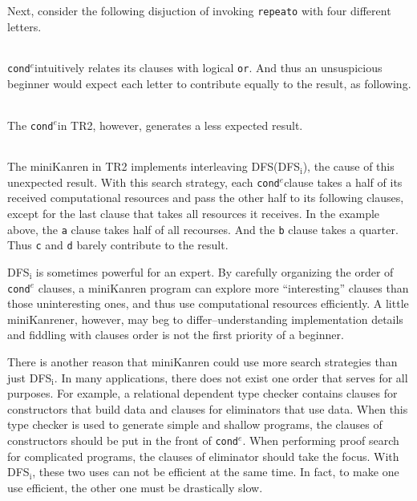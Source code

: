 \documentclass[format=acmlarge, review=true, authordraft=true]{acmart}
\newcommand{\conde}{\texttt{cond$^e$}}
\newcommand{\clisting}[1]{
\begin{center}
  \begin{tabular}{c}
	
    \end{tabular}
\end{center}
}
\newcommand{\DFSi}[0]{DFS$_\textrm{i}$}
\begin{document}
\clisting{Figures/repeato.rkt}

Next, consider the following disjuction of invoking \texttt{repeato} with four 
different letters.

\clisting{Figures/example.rkt}

\conde intuitively relates its clauses with logical \texttt{or}. And thus an 
unsuspicious beginner would expect each letter to contribute equally to the 
result, as following.

\clisting{Figures/run-repeato-fair.rkt}

The \conde in TR2, however, generates a less expected result.

\clisting{Figures/run-repeato-idfs.rkt}

The miniKanren in TR2 implements interleaving DFS(\DFSi), the cause of this 
unexpected result. With this search strategy, each \conde clause takes a half 
of its received computational resources and pass the other half to its 
following clauses, except for the last clause that takes all resources it 
receives. In the example above, the \texttt{a} clause takes half of all 
recourses. And the \texttt{b} clause takes a quarter. Thus \texttt{c} and 
\texttt{d} barely contribute to the result.


\DFSi{} is sometimes powerful for an expert. By carefully organizing the order 
of \conde{} clauses, a miniKanren program can explore more ``interesting'' 
clauses than those uninteresting ones, and thus use computational resources 
efficiently. A little miniKanrener, however, may beg to differ--understanding
implementation details and fiddling with clauses order is not the first
priority of a beginner.

There is another reason that miniKanren could use more search strategies than
just \DFSi. In many applications, there does not exist one order that serves
for all purposes. For example, a relational dependent type checker contains
clauses for constructors that build data and clauses for eliminators that use
data. When this type checker is used to generate simple and shallow programs,
the clauses of constructors should be put in the front of \conde.
When performing proof search for complicated programs, the clauses of eliminator
should take the focus. With \DFSi, these two uses can not be efficient at the
same time. In fact, to make one use efficient, the other one must be drastically
slow.
\end{document}
